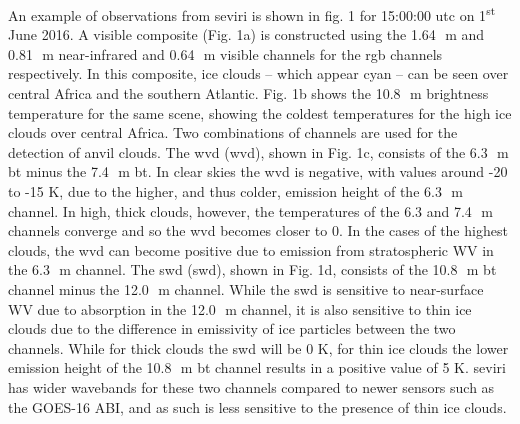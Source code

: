 An example of observations from \acrshort{seviri} is shown in fig. 1 for 15:00:00
\acrshort{utc} on 1\textsuperscript{st} June 2016. A visible composite (Fig. 1a) is
constructed using the 1.64\,\unit{\mu m} and 0.81\,\unit{\mu m} near-infrared and 0.64\,\unit{\mu m} visible
channels for the \acrshort{rgb} channels respectively. In this
composite, ice clouds -- which appear cyan -- can be seen over central
Africa and the southern Atlantic. Fig. 1b shows the 10.8\,\unit{\mu m} brightness
temperature for the same scene, showing the coldest temperatures for the
high ice clouds over central Africa. Two combinations of channels are
used for the detection of anvil clouds. The \acrshort{wvd}
(\acrshort{wvd}), shown in Fig. 1c, consists of the 6.3\,\unit{\mu m} \acrshort{bt}
minus the 7.4\,\unit{\mu m} \acrshort{bt}. In clear skies the \acrshort{wvd} is
negative, with values around -20 to -15 K, due to the higher, and thus
colder, emission height of the 6.3\,\unit{\mu m} channel. In high, thick clouds,
however, the temperatures of the 6.3 and 7.4\,\unit{\mu m} channels converge and so
the \acrshort{wvd} becomes closer to 0. In the cases of the highest clouds, the \acrshort{wvd}
can become positive due to emission from stratospheric WV in the 6.3\,\unit{\mu m}
channel. The \acrshort{swd} (\acrshort{swd}), shown in Fig. 1d, consists
of the 10.8\,\unit{\mu m} \acrshort{bt} channel minus the 12.0\,\unit{\mu m} channel. While the \acrshort{swd} is
sensitive to near-surface WV due to absorption in the 12.0\,\unit{\mu m} channel, it
is also sensitive to thin ice clouds due to the difference in emissivity
of ice particles between the two channels. While for thick clouds the
\acrshort{swd} will be 0 K, for thin ice clouds the lower emission height of the
10.8\,\unit{\mu m} \acrshort{bt} channel results in a positive value of 5 K. \acrshort{seviri} has wider
wavebands for these two channels compared to newer sensors such as the
GOES-16 ABI, and as such is less sensitive to the presence of thin ice
clouds.

